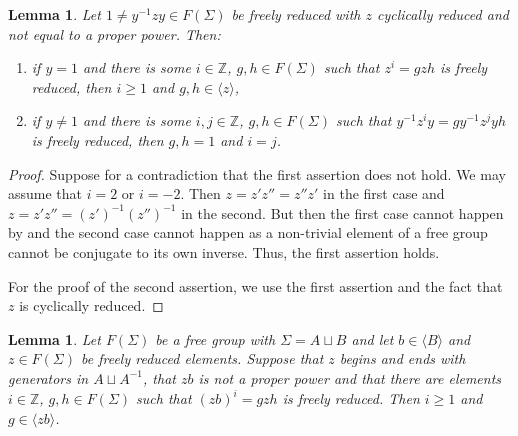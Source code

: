 \documentclass[11pt, a4paper]{amsart}
\newtheorem{lemma}[theorem]{Lemma}
\theoremstyle{definition}
\newcommand{\Z}{\mathbb{Z}}
\begin{document}
\begin{lemma}
\label{no_double_subword_1}
Let $1 \neq y^{-1}zy\in F(\Sigma)$ be freely reduced with $z$ cyclically reduced and not equal to a proper power. Then:
\begin{enumerate}
\item if $y = 1$ and there is some $i\in \Z$, $g, h\in F(\Sigma)$ such that $z^i = gzh$ is freely reduced, then $i\geq 1$ and $g,h\in \langle z\rangle$,
\item if $y\neq 1$ and there is some $i, j\in \Z$, $g, h\in F(\Sigma)$ such that $y^{-1}z^iy = gy^{-1}z^jyh$ is freely reduced, then $g, h = 1$ and $i = j$.
\end{enumerate}
\end{lemma}

\begin{proof}
Suppose for a contradiction that the first assertion does not hold. We may assume that $i = 2$ or $i = -2$. Then $z = z'z'' = z''z'$ in the first case and $z = z'z'' = (z')^{-1}(z'')^{-1}$ in the second. But then the first case cannot happen by \cite[Lemma 3]{lyndon_62} and the second case cannot happen as a non-trivial element of a free group cannot be conjugate to its own inverse. Thus, the first assertion holds.

For the proof of the second assertion, we use the first assertion and the fact that $z$ is cyclically reduced.
\end{proof}

\begin{lemma}
\label{no_double_subword_2}
Let $F(\Sigma)$ be a free group with $\Sigma = A\sqcup B$ and let $b\in \langle B\rangle$ and $z\in F(\Sigma)$ be freely reduced elements. Suppose that $z$ begins and ends with generators in $A\sqcup A^{-1}$, that $zb$ is not a proper power and that there are elements $i\in \Z$, $g, h\in F(\Sigma)$ such that $(zb)^i = gzh$ is freely reduced. Then $i\geq 1$ and $g\in \langle zb\rangle$.
\end{lemma}
\end{document}
